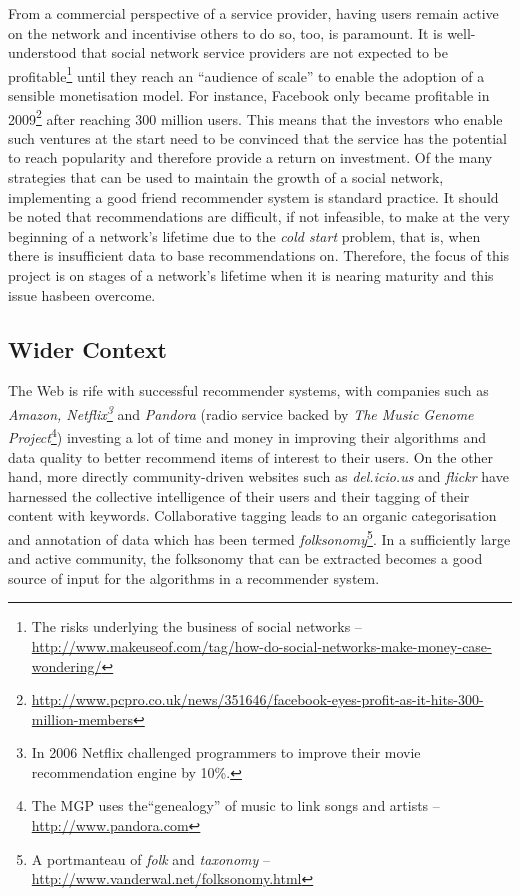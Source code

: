 \documentclass[a4paper,12pt,twoside,notitlepage]{report}
\begin{document}
From a commercial perspective of a service provider, having users remain active
on the network and incentivise others to do so, too, is paramount. It is
well-understood that social network service providers are not expected to be
profitable\footnote{The 
risks underlying the business of social networks -- 
\url{http://www.makeuseof.com/tag/how-do-social-networks-make-money-case-wondering/}} 
until they reach an ``audience of scale'' to enable the adoption of a sensible 
monetisation model. For instance, Facebook only became profitable in 2009\footnote{
\url{http://www.pcpro.co.uk/news/351646/facebook-eyes-profit-as-it-hits-300-million-members}} 
after reaching 300 million users. This means that the investors who enable such 
ventures at the start need to be convinced that the service has the potential 
to reach popularity and therefore provide a return on investment. Of the many 
strategies that can be used to maintain the growth of a social network, 
implementing a good friend recommender system is standard practice. It should be
noted that recommendations are difficult, if not infeasible, to make at the
very beginning of a network's lifetime due to the \emph{cold start} problem,
that is, when there is insufficient data to base recommendations on. Therefore,
the focus of this project is on stages of a network's lifetime when it is
nearing maturity and this issue hasbeen overcome.

\subsection{Wider Context}

The Web is rife with successful recommender systems, with companies such as 
\emph{Amazon, Netflix\footnote{In 2006 Netflix challenged programmers to 
improve their movie recommendation engine by 10\%.}} and \emph{Pandora} 
(radio service backed by \emph{The Music Genome Project}\footnote{The MGP 
uses the``genealogy'' of music to link songs and artists -- 
\url{http://www.pandora.com}}) investing a lot of time and money in improving 
their algorithms and data quality to better recommend items of interest to 
their users. On the other hand, more directly community-driven websites such as 
\emph{del.icio.us} and \emph{flickr} have harnessed the collective 
intelligence of their users and their tagging of their content with keywords. 
Collaborative tagging leads to an organic categorisation and annotation of data 
which has been termed \emph{folksonomy}\footnote{A portmanteau of 
\emph{folk} and \emph{taxonomy} -- 
\url{http://www.vanderwal.net/folksonomy.html}}. In a sufficiently large and 
active community, the folksonomy that can be extracted becomes a good source of 
input for the algorithms in a recommender system. 
\end{document}
